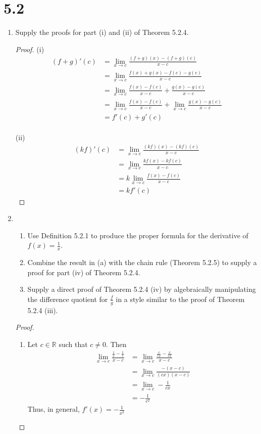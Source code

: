 \section*{5.2}
\begin{enumerate}
    \item Supply the proofs for part (i) and (ii) of Theorem 5.2.4.
    \begin{proof}
    (i) 
    \begin{align*}
        (f+g)'(c) &= \lim_{x \rightarrow c} \frac{(f+g)(x) - (f+g)(c)}{x-c}    \\
        &= \lim_{x \rightarrow c} \frac{f(x)+g(x) - f(c) - g(c)}{x-c} \\
        &= \lim_{x \rightarrow c} \frac{f(x) - f(c)}{x-c} + \frac{g(x) - g(c)}{x-c} \\
        &= \lim_{x \rightarrow c} \frac{f(x) - f(c)}{x-c} + \lim_{x \rightarrow c} \frac{g(x) - g(c)}{x-c} \\
        &= f'(c) + g'(c)
    \end{align*}
    \\
    (ii)
    \begin{align*}
    (kf)'(c) &= \lim_{x \rightarrow c} \frac{(kf)(x) - (kf)(c)}{x-c} \\
    &= \lim_{x \rightarrow c} \frac{kf(x) - kf(c)}{x-c} \\
    &= k \lim_{x \rightarrow c} \frac{f(x) - f(c)}{x-c} \\
    &= k f'(c)
    \end{align*}
    \end{proof}
    
    \item 
    \begin{enumerate}
        \item Use Definition 5.2.1 to produce the proper formula for the derivative of \( f(x) = \frac{1}{x} \). 
        \item Combine the result in (a) with the chain rule (Theorem 5.2.5) to supply a proof for part (iv) of Theorem 5.2.4.
        \item Supply a direct proof of Theorem 5.2.4 (iv) by algebraically manipulating the difference quotient for \( \frac{f}{g} \) in a style similar to the proof of Theorem 5.2.4 (iii). 
    \end{enumerate}
    
    \begin{proof}
    \begin{enumerate}
        \item Let \( c \in \mathbb{R} \) such that \( c \neq 0 \). Then
        \begin{align*}
            \lim_{x \rightarrow c} \frac{\frac{1}{x}- \frac{1}{c}}{x-c} &= \lim_{x \rightarrow c} \frac{\frac{c}{cx} - \frac{x}{cx}}{x-c} \\
            &= \lim_{x \rightarrow c} \frac{-(x-c)}{(cx)(x-c)} \\
            &= \lim_{x \rightarrow c} -\frac{1}{cx} \\
            &= - \frac{1}{c^{2}}
        \end{align*}
        Thus, in general, \( f'(x) = -\frac{1}{x^{2}} \)
        

\end{enumerate}
\end{proof}
\end{enumerate}
